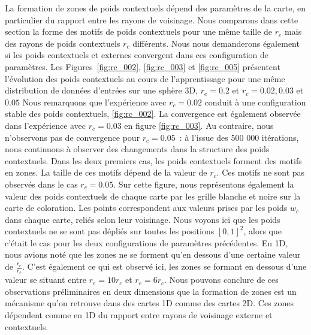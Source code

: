 \documentclass[../main]{subfiles}
\begin{document}
La formation de zones de poids contextuels dépend des paramètres de la carte, en particulier du rapport entre les rayons de voisinage.
Nous comparons dans cette section la forme des motifs de poids contextuels pour une même taille de $r_e$ mais des rayons de poids contextuels $r_c$ différents.
Nous nous demanderons également si les poids contextuels et externes convergent dans ces configuration de paramètres.
Les Figures~\ref{fig:rc_002}, \ref{fig:rc_003} et \ref{fig:rc_005} présentent l'évolution des poids contextuels au cours de l'apprentissage pour une même distribution de données d'entrées sur une sphère 3D, $r_e = 0.2$ et $r_c = 0.02, 0.03$ et $0.05$
Nous remarquons que l'expérience avec $r_c = 0.02$ conduit à une configuration stable des poids contextuels, \ref{fig:rc_002}. 
La convergence est également observée dans l'expérience avec $r_c = 0.03$ en figure \ref{fig:rc_003}. Au contraire, nous n'observons pas de convergence pour $r_c =0.05$~: à l'issue des 500 000 itérations, nous continuons à observer des changements dans la structure des poids contextuels. 
Dans les deux premiers cas, les poids contextuels forment des motifs en zones. La taille de ces motifs dépend de la valeur de $r_c$. Ces motifs ne sont pas observés dans le cas $r_c = 0.05$. 
Sur cette figure, nous représentons également la valeur des poids contextuels de chaque carte par les grille blanche et noire sur la carte de coloration. Les points  correspondent aux valeurs prises par les poids $w_c$ dans chaque carte, reliés selon leur voisinage.
Nous voyons ici que les poids contextuels ne se sont pas dépliés sur toutes les positions $[0,1]^2$, alors que c'était le cas pour les deux configurations de paramètres précédentes.
En 1D, nous avions noté que les zones ne se forment qu'en dessous d'une certaine valeur de $\frac{r_e}{r_c}$.
C'est également ce qui est observé ici, les zones se formant en dessous d'une valeur se situant entre $r_e = 10 r_c$ et $r_e = 6 r_c$.
Nous pouvons conclure de ces observations préliminaires en deux dimensions que la formation de zones est un mécanisme qu'on retrouve dans des cartes 1D comme des cartes 2D. Ces zones dépendent comme en 1D du rapport entre rayons de voisinage externe et contextuels.
\end{document}

